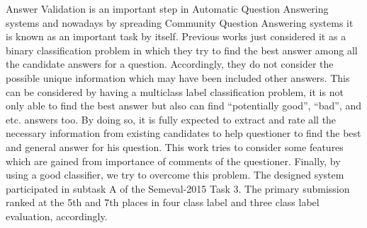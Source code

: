 ‎Answer Validation is an important step in Automatic Question Answering systems and nowadays by spreading Community Question Answering systems it is known as an important task by itself‎. ‎Previous works just considered it as a binary classification problem in which they try to find the best answer among all the candidate answers for a question‎. Accordingly, they do not consider the possible unique information which may have been included other answers‎. ‎This can be considered by having a multiclass label classification problem, it is not only able to find the best answer but also can find ``potentially good'', ``bad'', and etc‎. ‎answers too‎. By doing so, it is fully expected to extract and rate ‎all the necessary information from existing candidates to help questioner to find the best ‎and general answer for his question‎. ‎This work tries to consider some features which are gained from importance of comments of the questioner‎. ‎Finally‎, ‎by using a good classifier‎, ‎we try to overcome this problem‎. ‎The designed system participated in subtask A of the Semeval-2015 Task 3‎. ‎The primary submission ranked at the 5th and 7th places in four class label and three class label evaluation‎, ‎accordingly‎.
